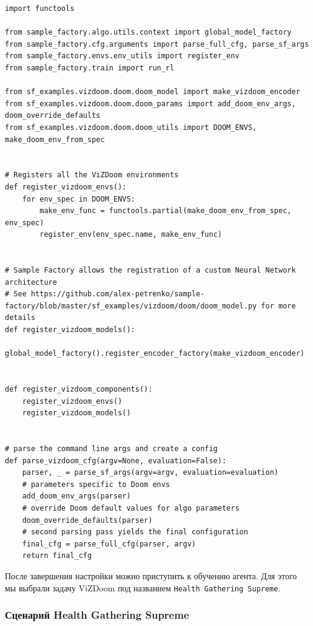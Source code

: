 \documentclass[11pt,a4paper]{article}
\begin{document}
\begin{lstlisting}
import functools

from sample_factory.algo.utils.context import global_model_factory
from sample_factory.cfg.arguments import parse_full_cfg, parse_sf_args
from sample_factory.envs.env_utils import register_env
from sample_factory.train import run_rl

from sf_examples.vizdoom.doom.doom_model import make_vizdoom_encoder
from sf_examples.vizdoom.doom.doom_params import add_doom_env_args, doom_override_defaults
from sf_examples.vizdoom.doom.doom_utils import DOOM_ENVS, make_doom_env_from_spec


# Registers all the ViZDoom environments
def register_vizdoom_envs():
    for env_spec in DOOM_ENVS:
        make_env_func = functools.partial(make_doom_env_from_spec, env_spec)
        register_env(env_spec.name, make_env_func)


# Sample Factory allows the registration of a custom Neural Network architecture
# See https://github.com/alex-petrenko/sample-factory/blob/master/sf_examples/vizdoom/doom/doom_model.py for more details
def register_vizdoom_models():
    global_model_factory().register_encoder_factory(make_vizdoom_encoder)


def register_vizdoom_components():
    register_vizdoom_envs()
    register_vizdoom_models()


# parse the command line args and create a config
def parse_vizdoom_cfg(argv=None, evaluation=False):
    parser, _ = parse_sf_args(argv=argv, evaluation=evaluation)
    # parameters specific to Doom envs
    add_doom_env_args(parser)
    # override Doom default values for algo parameters
    doom_override_defaults(parser)
    # second parsing pass yields the final configuration
    final_cfg = parse_full_cfg(parser, argv)
    return final_cfg
\end{lstlisting}

После завершения настройки можно приступить к обучению агента. Для этого мы выбрали задачу ViZDoom под названием \texttt{Health\ Gathering\ Supreme}.

\subsubsection{Сценарий Health Gathering Supreme}\label{the-scenario-health-gathering-supreme}

\end{document}
